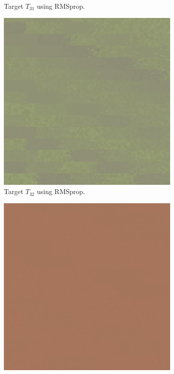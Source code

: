 \begin{figure}[h]
\begin{subfigure}[t]{.25\textwidth}
    \caption{Target $T_{31}$ using RMSprop.}
    \label{fig:M3MSEFinalRendersTwoParamRMSprop}
\end{subfigure}\hspace{0.7cm}
\begin{subfigure}[t]{.25\textwidth}
    \centering
    \includegraphics[width=\linewidth]{img/evaluation/M3/random/MSE_RMSprop_random_final.png}
    \caption{Target $T_{32}$ using RMSprop.}
    \label{fig:M3MSEFinalRendersRandomRMSprop}
\end{subfigure}\hspace{0.7cm}
\begin{subfigure}[t]{.25\textwidth}
    \centering
    \includegraphics[width=\linewidth]{img/evaluation/M3/real life/MSE_RMSprop_real_life_final.png}

\end{subfigure}
\end{figure}
